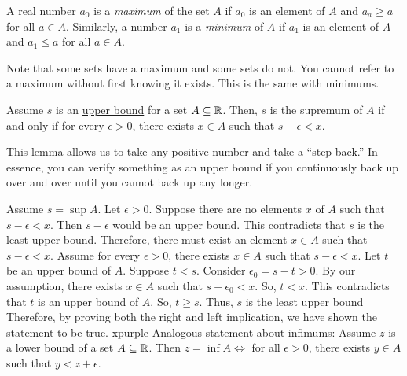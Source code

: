 \setcounter{BoxCounter}{3}

\begin{definition}
    A real number \(a_0\) is a \textit{maximum} of the set \(A\) if \(a_0\) is an element of \(A\) and \(a_a \geq a\) for all \(a \in A\). Similarly, a number \(a_1\) is a \textit{minimum} of \(A\) if \(a_1\) is an element of \(A\) and \(a_1 \leq a\) for all \(a \in A\).
\end{definition}

Note that some sets have a maximum and some sets do not. You cannot refer to a maximum without first knowing it exists. This is the same with minimums.

\begin{lemma}
    Assume \(s\) is an \hyperref[def:1.3.1]{upper bound} for a set \(A \subseteq \mathbb{R}\). Then, \(s\) is the supremum of \(A\) if and only if for every \(\epsilon > 0\), there exists \(x\in A\) such that \(s - \epsilon < x\).
\end{lemma}

This lemma allows us to take any positive number and take a ``step back.'' In essence, you can verify something as an upper bound if you continuously back up over and over until you cannot back up any longer.

\iffpfbase%
{
    Assume \(s = \sup A\). Let \(\epsilon > 0\). Suppose there are no elements \(x\) of \(A\) such that \(s - \epsilon < x\). Then \(s - \epsilon\) would be an upper bound. This contradicts that \(s\) is the least upper bound. Therefore, there must exist an element \(x \in A\) such that \(s - \epsilon < x\).
}{
    Assume for every \(\epsilon > 0\), there exists \(x \in A\) such that \(s - \epsilon < x\). Let \(t\) be an upper bound of \(A\). Suppose \(t < s\). Consider \(\epsilon_0 = s - t > 0\). By our assumption, there exists \(x \in A\) such that \(s - \epsilon_0 < x\). So, \(t < x\). This contradicts that \(t\) is an upper bound of \(A\). So, \(t \geq s\). Thus, \(s\) is the least upper bound
}{
    Therefore, by proving both the right and left implication, we have shown the statement to be true.
}{xpurple}
Analogous statement about infimums: Assume \(z\) is a lower bound of a set \(A \subseteq \mathbb{R}\). Then \(z = \inf A \iff \) for all \( \epsilon >0\), there exists \(y \in A\) such that \(y < z + \epsilon\).


